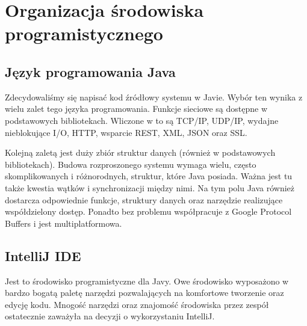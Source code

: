 \section[Organizacja środowiska programistycznego]{Organizacja środowiska programistycznego}

\subsection[Język programowania Java]{Język programowania Java}

\par{Zdecydowaliśmy się napisać kod źródłowy systemu w Javie. Wybór ten wynika z wielu zalet tego języka programowania. Funkcje sieciowe są dostępne w podstawowych bibliotekach. Wliczone w to są TCP/IP, UDP/IP, wydajne nieblokujące I/O, HTTP, wsparcie REST, XML, JSON oraz SSL.}

\par{Kolejną zaletą jest duży zbiór struktur danych (również w podstawowych bibliotekach). Budowa rozproszonego systemu wymaga wielu, często skomplikowanych i różnorodnych, struktur, które Java posiada. Ważna jest tu także kwestia wątków i synchronizacji między nimi. Na tym polu Java również dostarcza odpowiednie funkcje, struktury danych oraz narzędzie realizujące współdzielony dostęp. Ponadto bez problemu współpracuje z Google Protocol Buffers i jest multiplatformowa.}

\subsection[IntelliJ IDE]{IntelliJ IDE}

\par{Jest to środowisko programistyczne dla Javy. Owe środowisko wyposażono w bardzo bogatą paletę narzędzi pozwalających na komfortowe tworzenie oraz edycję kodu. Mnogość narzędzi oraz znajomość środowiska przez zespół ostatecznie zaważyła na decyzji o wykorzystaniu IntelliJ.}

